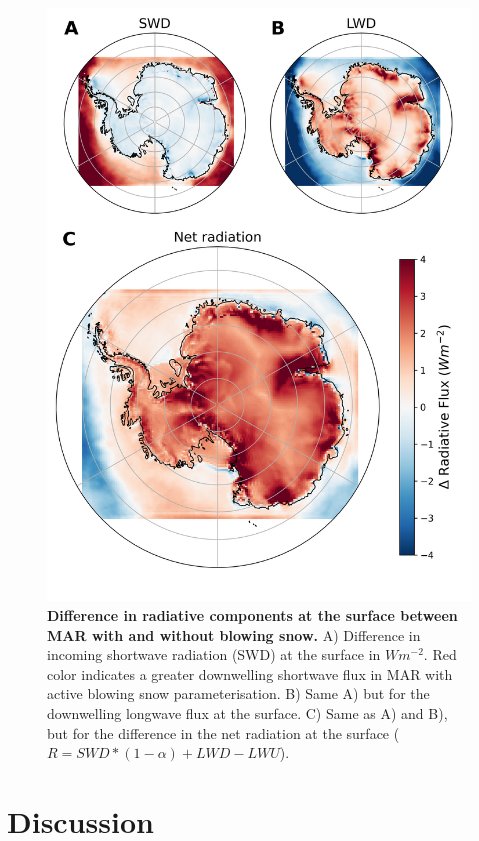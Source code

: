 \documentclass[12pt]{article}
\begin{document}
\begin{figure}[H]
	\includegraphics[scale=0.7,center]{SEB.png}
	\caption{\textbf{Difference in radiative components at the surface between MAR with and without blowing snow.} A) Difference in incoming shortwave radiation (SWD) at the surface in $Wm^{-2}$. Red color indicates a greater downwelling shortwave flux in MAR with active blowing snow parameterisation. B) Same A) but for the downwelling longwave flux at the surface. C) Same as A) and B), but for the difference in the net radiation at the surface ($R= SWD * (1 - \alpha) + LWD - LWU$).}
	\label{fig:SEB}
\end{figure}


\section*{Discussion}
\end{document}
